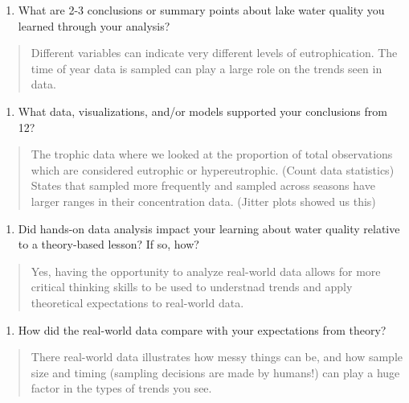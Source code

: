 \documentclass[]{article}
\providecommand{\tightlist}{%
  \setlength{\itemsep}{0pt}\setlength{\parskip}{0pt}}
\begin{document}
\begin{enumerate}
\def\labelenumi{\arabic{enumi}.}
\setcounter{enumi}{11}
\tightlist
\item
  What are 2-3 conclusions or summary points about lake water quality
  you learned through your analysis?
\end{enumerate}

\begin{quote}
Different variables can indicate very different levels of
eutrophication. The time of year data is sampled can play a large role
on the trends seen in data.
\end{quote}

\begin{enumerate}
\def\labelenumi{\arabic{enumi}.}
\setcounter{enumi}{12}
\tightlist
\item
  What data, visualizations, and/or models supported your conclusions
  from 12?
\end{enumerate}

\begin{quote}
The trophic data where we looked at the proportion of total observations
which are considered eutrophic or hypereutrophic. (Count data
statistics) States that sampled more frequently and sampled across
seasons have larger ranges in their concentration data. (Jitter plots
showed us this)
\end{quote}

\begin{enumerate}
\def\labelenumi{\arabic{enumi}.}
\setcounter{enumi}{13}
\tightlist
\item
  Did hands-on data analysis impact your learning about water quality
  relative to a theory-based lesson? If so, how?
\end{enumerate}

\begin{quote}
Yes, having the opportunity to analyze real-world data allows for more
critical thinking skills to be used to understnad trends and apply
theoretical expectations to real-world data.
\end{quote}

\begin{enumerate}
\def\labelenumi{\arabic{enumi}.}
\setcounter{enumi}{14}
\tightlist
\item
  How did the real-world data compare with your expectations from
  theory?
\end{enumerate}

\begin{quote}
There real-world data illustrates how messy things can be, and how
sample size and timing (sampling decisions are made by humans!) can play
a huge factor in the types of trends you see.
\end{quote}
\end{document}
